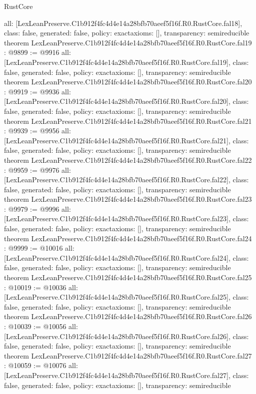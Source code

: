 \begin{lexlean}{RustCore}
\begin{coremodule}
{  all: [LexLeanPreserve.C1b912f4fc4d4e14a28bfb70aeef5f16f.R0.RustCore.fal18],
  class: false,
  generated: false,
  policy: exact{axioms: []},
  transparency: semireducible
}
theorem LexLeanPreserve.C1b912f4fc4d4e14a28bfb70aeef5f16f.R0.RustCore.fal19 : @9899 := @9916 {
  all: [LexLeanPreserve.C1b912f4fc4d4e14a28bfb70aeef5f16f.R0.RustCore.fal19],
  class: false,
  generated: false,
  policy: exact{axioms: []},
  transparency: semireducible
}
theorem LexLeanPreserve.C1b912f4fc4d4e14a28bfb70aeef5f16f.R0.RustCore.fal20 : @9919 := @9936 {
  all: [LexLeanPreserve.C1b912f4fc4d4e14a28bfb70aeef5f16f.R0.RustCore.fal20],
  class: false,
  generated: false,
  policy: exact{axioms: []},
  transparency: semireducible
}
theorem LexLeanPreserve.C1b912f4fc4d4e14a28bfb70aeef5f16f.R0.RustCore.fal21 : @9939 := @9956 {
  all: [LexLeanPreserve.C1b912f4fc4d4e14a28bfb70aeef5f16f.R0.RustCore.fal21],
  class: false,
  generated: false,
  policy: exact{axioms: []},
  transparency: semireducible
}
theorem LexLeanPreserve.C1b912f4fc4d4e14a28bfb70aeef5f16f.R0.RustCore.fal22 : @9959 := @9976 {
  all: [LexLeanPreserve.C1b912f4fc4d4e14a28bfb70aeef5f16f.R0.RustCore.fal22],
  class: false,
  generated: false,
  policy: exact{axioms: []},
  transparency: semireducible
}
theorem LexLeanPreserve.C1b912f4fc4d4e14a28bfb70aeef5f16f.R0.RustCore.fal23 : @9979 := @9996 {
  all: [LexLeanPreserve.C1b912f4fc4d4e14a28bfb70aeef5f16f.R0.RustCore.fal23],
  class: false,
  generated: false,
  policy: exact{axioms: []},
  transparency: semireducible
}
theorem LexLeanPreserve.C1b912f4fc4d4e14a28bfb70aeef5f16f.R0.RustCore.fal24 : @9999 := @10016 {
  all: [LexLeanPreserve.C1b912f4fc4d4e14a28bfb70aeef5f16f.R0.RustCore.fal24],
  class: false,
  generated: false,
  policy: exact{axioms: []},
  transparency: semireducible
}
theorem LexLeanPreserve.C1b912f4fc4d4e14a28bfb70aeef5f16f.R0.RustCore.fal25 : @10019 := @10036 {
  all: [LexLeanPreserve.C1b912f4fc4d4e14a28bfb70aeef5f16f.R0.RustCore.fal25],
  class: false,
  generated: false,
  policy: exact{axioms: []},
  transparency: semireducible
}
theorem LexLeanPreserve.C1b912f4fc4d4e14a28bfb70aeef5f16f.R0.RustCore.fal26 : @10039 := @10056 {
  all: [LexLeanPreserve.C1b912f4fc4d4e14a28bfb70aeef5f16f.R0.RustCore.fal26],
  class: false,
  generated: false,
  policy: exact{axioms: []},
  transparency: semireducible
}
theorem LexLeanPreserve.C1b912f4fc4d4e14a28bfb70aeef5f16f.R0.RustCore.fal27 : @10059 := @10076 {
  all: [LexLeanPreserve.C1b912f4fc4d4e14a28bfb70aeef5f16f.R0.RustCore.fal27],
  class: false,
  generated: false,
  policy: exact{axioms: []},
  transparency: semireducible
}
\end{coremodule}
\end{lexlean}

